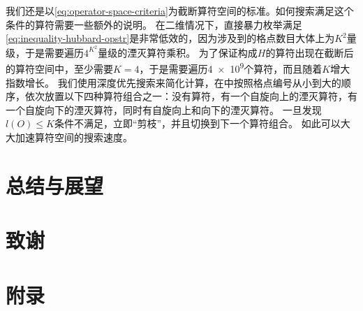 \documentclass[oneside]{fduthesis}
\begin{document}
我们还是以\eqref{eq:operator-space-criteria}为截断算符空间的标准。如何搜索满足这个条件的算符需要一些额外的说明。
在二维情况下，直接暴力枚举满足\eqref{eq:inequality-hubbard-opstr}是非常低效的，因为涉及到的格点数目大体上为$K^2$量级，于是需要遍历$4^{K^2}$量级的湮灭算符乘积。
为了保证构成$H$的算符出现在截断后的算符空间中，至少需要$K=4$，于是需要遍历\num{4e9}个算符，而且随着$K$增大指数增长。
我们使用深度优先搜索来简化计算，在中按照格点编号从小到大的顺序，依次放置以下四种算符组合之一：没有算符，有一个自旋向上的湮灭算符，有一个自旋向下的湮灭算符，同时有自旋向上和向下的湮灭算符。
一旦发现$l(O) \leq K$条件不满足，立即“剪枝”，并且切换到下一个算符组合。
如此可以大大加速算符空间的搜索速度。

\chapter{总结与展望}


\backmatter

\printbibliography

\chapter{致\quad 谢}

\chapter{附\quad 录}
\end{document}
